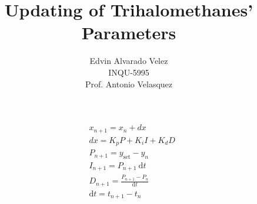 \documentclass[12pt,letterpaper]{article}
\author{Edvin Alvarado Velez \\ INQU-5995 \\ Prof. Antonio Velasquez}
\title{Updating of Trihalomethanes' Parameters}
\begin{document}
	
		
		
		
		
	
		
	\begin{align*}
		&x_{n+1} = x_n + dx \\
		&dx = K_p P + K_i I + K_d D \\
		&P_{n+1} = y_{\text{set}} - y_n \\
		&I_{n+1} = P_{n+1} \ \mathrm{d}t \\
		&D_{n+1} = \frac{P_{n+1} - P_n}{\mathrm{d}t} \\
		&\mathrm{d}t = t_{n+1} - t_n
	\end{align*}
\end{document}
